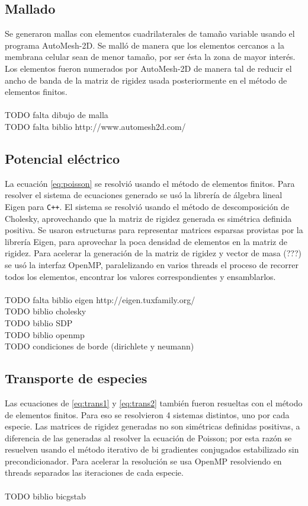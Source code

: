 \documentclass[a4paper,10pt]{article}
\begin{document}
\subsection{Mallado}
Se generaron mallas con elementos cuadrilaterales de tamaño variable usando el programa AutoMesh-2D. Se malló de manera que los elementos cercanos a la membrana celular sean de menor tamaño, por ser ésta la zona de mayor interés. Los elementos fueron numerados por AutoMesh-2D de manera tal de reducir el ancho de banda de la matriz de rigidez usada posteriormente en el método de elementos finitos.\\
\\TODO falta dibujo de malla
\\TODO falta biblio http://www.automesh2d.com/

\subsection{Potencial eléctrico}

La ecuación \ref{eq:poisson} se resolvió usando el método de elementos finitos. Para resolver el sistema de ecuaciones generado se usó la librería de álgebra lineal Eigen para \texttt{C++}. El sistema se resolvió usando el método de descomposición de Cholesky, aprovechando que la matriz de rigidez generada es simétrica definida positiva. Se usaron estructuras para representar matrices esparsas provistas por la librería Eigen, para aprovechar la poca densidad de elementos en la matriz de rigidez. Para acelerar la generación de la matriz de rigidez y vector de masa (???) se usó la interfaz OpenMP, paralelizando en varios threads el proceso de recorrer todos los elementos, encontrar los valores correspondientes y ensamblarlos.\\
\\TODO falta biblio eigen http://eigen.tuxfamily.org/
\\TODO biblio cholesky
\\TODO biblio SDP
\\TODO biblio openmp
\\TODO condiciones de borde (dirichlete y neumann)

\subsection{Transporte de especies}

Las ecuaciones de \ref{eq:trans1} y \ref{eq:trans2} también fueron resueltas con el método de elementos finitos. Para eso se resolvieron 4 sistemas distintos, uno por cada especie. Las matrices de rigidez generadas no son simétricas definidas positivas, a diferencia de las generadas al resolver la ecuación de Poisson; por esta razón se resuelven usando el método iterativo de bi gradientes conjugados estabilizado sin precondicionador. Para acelerar la resolución se usa OpenMP resolviendo en threads separados las iteraciones de cada especie.\\
\\TODO biblio bicgstab
\end{document}
